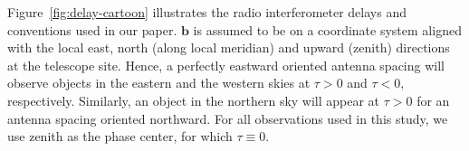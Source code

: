 \documentclass[preprint2,iop,numberedappendix,twocolappendix,appendixfloats]{emulateapj}
\begin{document}
Figure~\ref{fig:delay-cartoon} illustrates the radio interferometer delays and conventions used in our paper. $\boldsymbol{b}$ is assumed to be on a coordinate system aligned with the local east, north (along local meridian) and upward (zenith) directions at the telescope site. Hence, a perfectly eastward oriented antenna spacing will observe objects in the eastern and the western skies at $\tau>0$ and $\tau<0$, respectively. Similarly, an object in the northern sky will appear at $\tau>0$ for an antenna spacing oriented northward. For all observations used in this study, we use zenith as the phase center, for which $\tau\equiv 0$. 
\end{document}
